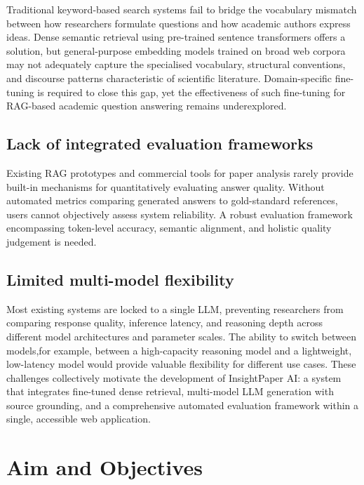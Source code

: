 Traditional keyword-based search systems fail to bridge the vocabulary mismatch between how researchers formulate questions and how academic authors express ideas. Dense semantic retrieval using pre-trained sentence transformers offers a solution, but general-purpose embedding models trained on broad web corpora may not adequately capture the specialised vocabulary, structural conventions, and discourse patterns characteristic of scientific literature. Domain-specific fine-tuning is required to close this gap, yet the effectiveness of such fine-tuning for RAG-based academic question answering remains underexplored.

\subsection{Lack of integrated evaluation frameworks}

Existing RAG prototypes and commercial tools for paper analysis rarely provide built-in mechanisms for quantitatively evaluating answer quality. Without automated metrics comparing generated answers to gold-standard references, users cannot objectively assess system reliability. A robust evaluation framework encompassing token-level accuracy, semantic alignment, and holistic quality judgement is needed.

\subsection{Limited multi-model flexibility}

Most existing systems are locked to a single LLM, preventing researchers from comparing response quality, inference latency, and reasoning depth across different model architectures and parameter scales. The ability to switch between models,for example, between a high-capacity reasoning model and a lightweight, low-latency model would provide valuable flexibility for different use cases.
\newline \newline These challenges collectively motivate the development of InsightPaper AI: a system that integrates fine-tuned dense retrieval, multi-model LLM generation with source grounding, and a comprehensive automated evaluation framework within a single, accessible web application.

\section{Aim and Objectives}

